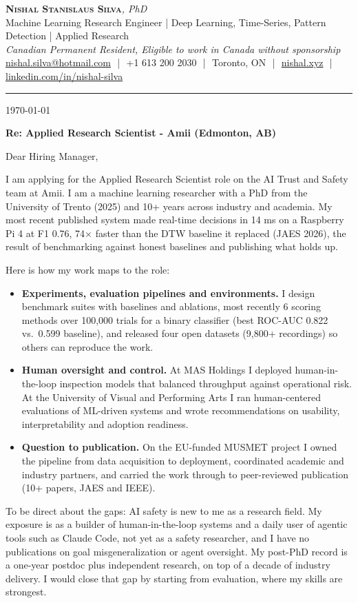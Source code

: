 \documentclass[11pt]{article}
\makeatletter
\newcommand{\clName}{Nishal Stanislaus Silva}
\newcommand{\clEmail}{nishal.silva@hotmail.com}
\newcommand{\clPhone}{+1 613 200 2030}
\newcommand{\clCity}{Toronto, ON}
\newcommand{\clSite}{https://nishal.xyz}
\newcommand{\clLinkedIn}{https://www.linkedin.com/in/nishal-silva}
\newcommand{\clStatus}{Canadian Permanent Resident, Eligible to work in Canada without sponsorship}
\newcommand{\clTagline}{Machine Learning Research Engineer | Deep Learning, Time-Series, Pattern Detection | Applied Research}
\newcommand{\clRole}{Applied Research Scientist}
\newcommand{\clCompany}{Amii}
\newcommand{\clTeam}{the AI Trust and Safety team}
\newcommand{\clAddressee}{Dear Hiring Manager,}
\makeatother
\begin{document}
\pagestyle{empty}

\begin{center}
    {\LARGE \scshape \textbf{\clName}}{\large \textit{, PhD}}
    \\[1pt]
    {\small \clTagline}
    \\[1pt]
    {\footnotesize\textit{\clStatus}}
    \\[1pt]
    {\small
    \href{mailto:\clEmail}{\clEmail}
    \,\,|\,\, \clPhone
    \,\,|\,\, \clCity
    \,\,|\,\, \href{\clSite}{nishal.xyz}
    \,\,|\,\, \href{\clLinkedIn}{linkedin.com/in/nishal-silva}}
\end{center}

\rule{\linewidth}{0.4pt}\vspace{0.6em}

\today

\textbf{Re: \clRole{} - \clCompany{} (Edmonton, AB)}

\clAddressee

I am applying for the \clRole{} role on \clTeam{} at \clCompany{}. I am a machine learning researcher with a PhD from the University of Trento (2025) and 10+ years across industry and academia. My most recent published system made real-time decisions in 14 ms on a Raspberry Pi 4 at F1 0.76, 74$\times$ faster than the DTW baseline it replaced (JAES 2026), the result of benchmarking against honest baselines and publishing what holds up.

Here is how my work maps to the role:
\begin{itemize}[leftmargin=1.4em, itemsep=0.1em, topsep=0.2em]
    \item \textbf{Experiments, evaluation pipelines and environments.} I design benchmark suites with baselines and ablations, most recently 6 scoring methods over 100,000 trials for a binary classifier (best ROC-AUC 0.822 vs.\ 0.599 baseline), and released four open datasets (9,800+ recordings) so others can reproduce the work.
    \item \textbf{Human oversight and control.} At MAS Holdings I deployed human-in-the-loop inspection models that balanced throughput against operational risk. At the University of Visual and Performing Arts I ran human-centered evaluations of ML-driven systems and wrote recommendations on usability, interpretability and adoption readiness.
    \item \textbf{Question to publication.} On the EU-funded MUSMET project I owned the pipeline from data acquisition to deployment, coordinated academic and industry partners, and carried the work through to peer-reviewed publication (10+ papers, JAES and IEEE).
\end{itemize}
To be direct about the gaps: AI safety is new to me as a research field. My exposure is as a builder of human-in-the-loop systems and a daily user of agentic tools such as Claude Code, not yet as a safety researcher, and I have no publications on goal misgeneralization or agent oversight. My post-PhD record is a one-year postdoc plus independent research, on top of a decade of industry delivery. I would close that gap by starting from evaluation, where my skills are strongest.
\end{document}
